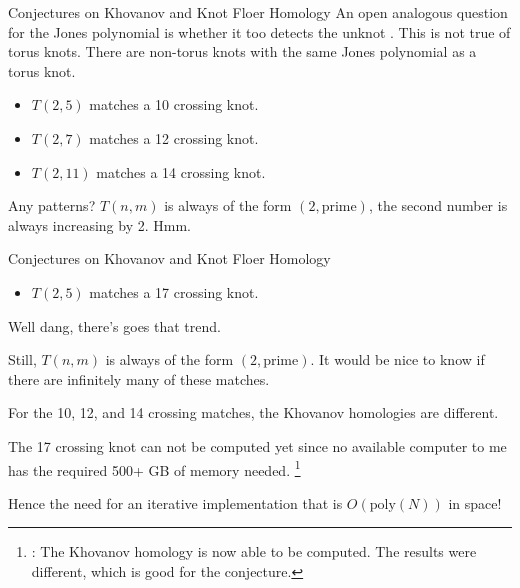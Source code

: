 \documentclass{beamer}
\begin{document}
    \begin{frame}{Conjectures on Khovanov and Knot Floer Homology}
        An open analogous question for the Jones polynomial is whether it too
        detects the unknot \cite{VerificationUnknotJonesConjUpTo24}.
        This is not true of torus knots. There are
        non-torus knots with the same Jones polynomial as a torus knot.
        \begin{itemize}
            \item $T(2,5)$ matches a 10 crossing knot.
            \item $T(2,7)$ matches a 12 crossing knot.
            \item $T(2,11)$ matches a 14 crossing knot.
        \end{itemize}
        Any patterns? $T(n,m)$ is always of the form $(2,\text{prime})$,
        the second number is always increasing by 2. Hmm.
    \end{frame}
    \begin{frame}{Conjectures on Khovanov and Knot Floer Homology}
        \begin{itemize}
            \item $T(2,5)$ matches a 17 crossing knot.
        \end{itemize}
        Well dang, there's goes that trend.
        \par\hfill\par
        Still, $T(n,m)$ is always of the form $(2,\text{prime})$. It would
        be nice to know if there are infinitely many of these matches.
        \par\hfill\par
        For the 10, 12, and 14
        crossing matches, the Khovanov homologies are different.
        \par\hfill\par
        The 17 crossing knot can not be computed yet since no
        available computer to me has the required 500+ GB of memory needed.%
        \footnote{%
            \textbf{\color{red}{Correction}}:
            The Khovanov homology is now able to be computed.
            The results were different, which is good for the conjecture.
        }
        \par\hfill\par
        Hence the need for an iterative implementation that is
        $O(\textrm{poly}(N))$ in space!
    \end{frame}
\end{document}
